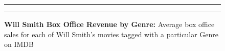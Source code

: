 \documentclass[]{article}
\begin{document}
\begin{figure}[!ht]
 \label{fig:one-graphic}
    \begin{center}
    \end{center}
    \hrule
      \vspace{2mm}
    \caption{ \textbf{Will Smith Box Office Revenue by Genre:} \newline \footnotesize{ Average box
    office sales for each of Will Smith's movies tagged with a particular Genre on IMDB}  }
    \vspace{2mm}
    \hrule
\end{figure}
\end{document}
